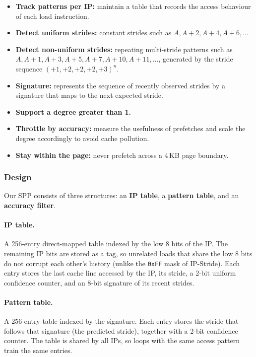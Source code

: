 \documentclass[11pt,a4paper]{article}
\begin{document}
  \begin{itemize}
    \item \textbf{Track patterns per IP:} maintain a table that records
    the access behaviour of each load instruction.
    \item \textbf{Detect uniform strides:} constant strides such as
    $A, A{+}2, A{+}4, A{+}6, \ldots$
    \item \textbf{Detect non-uniform strides:} repeating multi-stride
    patterns such as $A, A{+}1, A{+}3, A{+}5, A{+}7, A{+}10, A{+}11,
    \ldots$, generated by the stride sequence $(+1, +2, +2, +2, +3)^n$.
    \item \textbf{Signature:} represents the sequence of recently
    observed strides by a signature that maps to the next expected stride.
    \item \textbf{Support a degree greater than 1.}
    \item \textbf{Throttle by accuracy:} measure the usefulness of
    prefetches and scale the degree accordingly to avoid cache pollution.
    \item \textbf{Stay within the page:} never prefetch across a 4\,KB
    page boundary.
  \end{itemize}

  \subsubsection{Design}

  Our SPP consists of three structures: an \textbf{IP table}, a
  \textbf{pattern table}, and an \textbf{accuracy filter}.

  \paragraph{IP table.} A 256-entry direct-mapped table indexed by the
  low 8 bits of the IP. The remaining IP bits are stored as a tag, so
  unrelated loads that share the low 8 bits do not corrupt each other's
  history (unlike the \texttt{0xFF} mask of IP-Stride). Each entry stores
  the last cache line accessed by the IP, its stride, a 2-bit uniform
  confidence counter, and an 8-bit signature of its recent strides.

  \paragraph{Pattern table.} A 256-entry table indexed by the signature.
  Each entry stores the stride that follows that signature (the predicted stride),
  together with a 2-bit confidence counter. The table is shared by all
  IPs, so loops with the same access pattern train the same entries.
\end{document}

